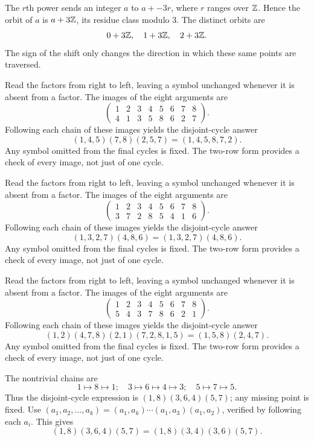 The $r$th power sends an integer $a$ to $a+-3r$, where $r$ ranges over $\mathbb{Z}$. Hence the orbit of $a$ is $a+3\mathbb{Z}$, its residue class modulo $3$. The distinct orbits are\[0+3\mathbb{Z},\quad 1+3\mathbb{Z},\quad 2+3\mathbb{Z}.\]The sign of the shift only changes the direction in which these same points are traversed.

\idea Read the factors from right to left, leaving a symbol unchanged whenever it is absent from a factor.
The images of the eight arguments are\[\begin{pmatrix}1 & 2 & 3 & 4 & 5 & 6 & 7 & 8\\4 & 1 & 3 & 5 & 8 & 6 & 2 & 7\end{pmatrix}.\]Following each chain of these images yields the disjoint-cycle answer\[(1,4,5)(7,8)(2,5,7)=(1,4,5,8,7,2).\]Any symbol omitted from the final cycles is fixed. The two-row form provides a check of every image, not just of one cycle.

\idea Read the factors from right to left, leaving a symbol unchanged whenever it is absent from a factor.
The images of the eight arguments are\[\begin{pmatrix}1 & 2 & 3 & 4 & 5 & 6 & 7 & 8\\3 & 7 & 2 & 8 & 5 & 4 & 1 & 6\end{pmatrix}.\]Following each chain of these images yields the disjoint-cycle answer\[(1,3,2,7)(4,8,6)=(1,3,2,7)(4,8,6).\]Any symbol omitted from the final cycles is fixed. The two-row form provides a check of every image, not just of one cycle.

\idea Read the factors from right to left, leaving a symbol unchanged whenever it is absent from a factor.
The images of the eight arguments are\[\begin{pmatrix}1 & 2 & 3 & 4 & 5 & 6 & 7 & 8\\5 & 4 & 3 & 7 & 8 & 6 & 2 & 1\end{pmatrix}.\]Following each chain of these images yields the disjoint-cycle answer\[(1,2)(4,7,8)(2,1)(7,2,8,1,5)=(1,5,8)(2,4,7).\]Any symbol omitted from the final cycles is fixed. The two-row form provides a check of every image, not just of one cycle.

 The nontrivial chains are\[1\mapsto8\mapsto1;\quad 3\mapsto6\mapsto4\mapsto3;\quad 5\mapsto7\mapsto5.\]Thus the disjoint-cycle expression is $(1,8)(3,6,4)(5,7)$; any missing point is fixed.
 Use $(a_1,a_2,\ldots,a_k)=(a_1,a_k)\cdots(a_1,a_3)(a_1,a_2)$, verified by following each $a_i$. This gives\[(1,8)(3,6,4)(5,7)=(1,8)(3,4)(3,6)(5,7).\]


